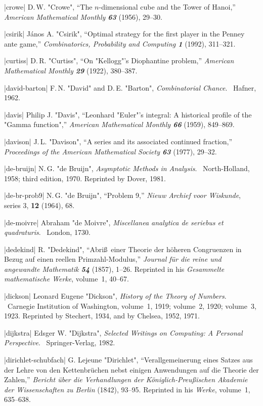\bib|crowe|%
D.\,W. "Crowe", ``The $n$-dimensional cube and the Tower of Hanoi,''
{\sl American Mathematical Monthly\/ \bf63} (1956), 29--30.

\bib|csirik|%
J\'anos A. "Csirik", ``Optimal strategy for the first player in the Penney
ante game,'' {\sl Combinatorics, Probability and Computing\/ \bf1} (1992),
311--321.

\bib|curtiss|%
D.\,R. "Curtiss", ``On "Kellogg"'s Diophantine problem,''
{\sl American Mathematical Monthly\/ \bf29} (1922), 380--387.

\bib|david-barton|%
F.\,N. "David" and D.\,E. "Barton", {\sl Combinatorial Chance}. \
Hafner, 1962.

\bib|davis|%
Philip J. "Davis", ``Leonhard "Euler"'s integral: A historical profile
of the "Gamma function",'' {\sl American Mathematical Monthly\/ \bf66}
(1959), 849--869.

\bib|davison|%
J.\,L. "Davison", ``A series and its associated continued fraction,''
{\sl Proceedings of the American Mathematical Society\/ \bf63}
(1977), 29--32.

\bib|de-bruijn|%
N.\,G. "de Bruijn", {\sl Asymptotic Methods in Analysis}. \
North-Holland, 1958; third edition, 1970. Reprinted by Dover, 1981.

\bib|de-br-prob9|%
N.\,G. "de Bruijn", ``Problem 9,'' {\sl Nieuw Archief voor Wiskunde},
series 3, {\bf12} (1964), 68.

\bib|de-moivre|%
Abraham "de Moivre", {\sl Miscellanea analytica de seriebus et quadraturis}. \
London, 1730.

\bib|dedekind|%
R. "Dedekind", ``Abri\ss\ einer Theorie der h\"oheren Congruenzen in
Bezug auf einen reellen Primzahl-Modulus,''
{\sl Journal f\"ur die reine und angewandte Mathematik\/ \bf54} (1857),
1--26. Reprinted in his {\sl Gesammelte mathematische Werke}, volume~1, 40--67.

\bib|dickson|%
Leonard Eugene "Dickson", {\sl History of the Theory of Numbers}. \
Carnegie Institution of Washington, volume~1, 1919; volume~2, 1920;
volume~3, 1923. Reprinted by Stechert, 1934, and by Chelsea, 1952, 1971.

\bib|dijkstra|%
Edsger W. "Dijkstra", {\sl Selected Writings on Computing: A Personal
Perspective}. \ Springer-Verlag, 1982.

\bib|dirichlet-schubfach|%
G. Lejeune "Dirichlet", ``Verallgemeinerung eines Satzes aus der Lehre
von den Kettenbr\"uchen nebst einigen Anwendungen auf die Theorie der
Zahlen,'' {\sl Bericht \"uber die Verhandlungen der K\"oniglich-Preu\ss ischen
Akademie der Wissenschaften zu Berlin\/} (1842), 93--95. Reprinted in
his {\sl Werke}, volume~1, 635--638.

